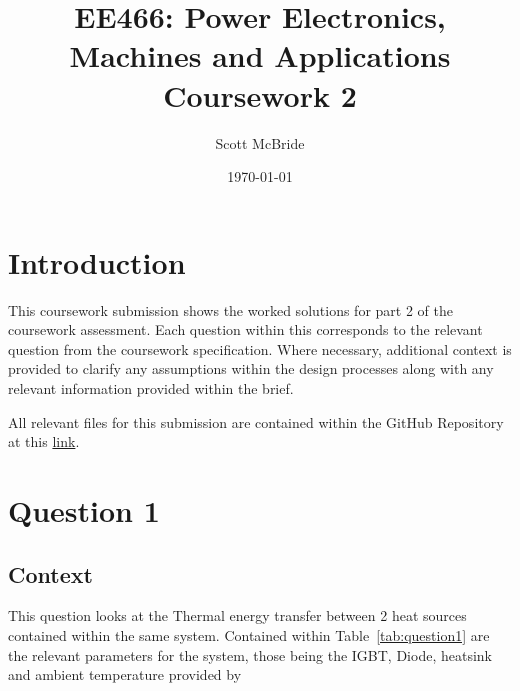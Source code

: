 \documentclass[a4paper, 12pt, titlepage]{report}
\begin{document}
\title{EE466: Power Electronics, Machines and Applications Coursework 2}
\author{Scott McBride}
\date{\today}
\maketitle
\tableofcontents
\chapter{Introduction}
This coursework submission shows the worked solutions for part 2 of the coursework assessment. Each question within this corresponds to the relevant question from the coursework specification. Where necessary, additional context is provided to clarify any assumptions within the design processes along with any relevant information provided within the brief.

All relevant files for this submission are contained within the GitHub Repository at this \href{https://github.com/WithASideOfSalt/EE466-Coursework-2}{link}.

\chapter{Question 1}
\section{Context}
This question looks at the Thermal energy transfer between 2 heat sources contained within the same system. Contained within Table~\ref{tab:question1} are the relevant parameters for the system, those being the IGBT, Diode, heatsink and ambient temperature provided by~\cite{EE466CourseworkPart2}
\end{document}
